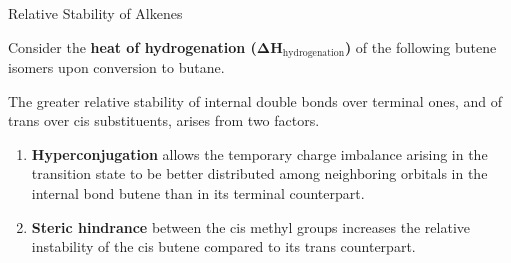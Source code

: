 \documentclass[10pt]{article}
\begin{document}
  \begin{core}{Relative Stability of Alkenes}

    Consider the \textbf{heat of hydrogenation (ΔH$_{\text{hydrogenation}}$)} of the following butene isomers upon conversion to butane.


    The greater relative stability of internal double bonds over terminal ones, and of trans over cis substituents, arises from two factors.

    \begin{enumerate}

      \item \textbf{Hyperconjugation} allows the temporary charge imbalance arising in the transition state to be better distributed among neighboring orbitals in the internal bond butene than in its terminal counterpart.

      \item \textbf{Steric hindrance} between the cis methyl groups increases the relative instability of the cis butene compared to its trans counterpart.



\end{enumerate}
\end{core}
\end{document}
